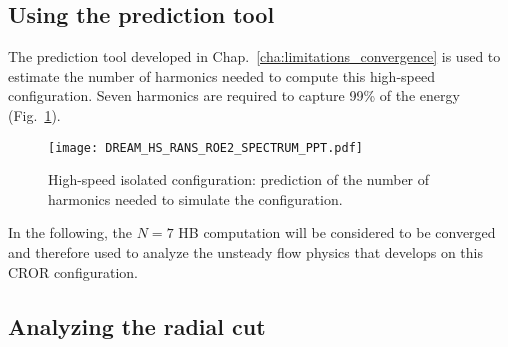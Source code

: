 
\subsection{Using the prediction tool}
\label{sub:dream_hs_conv_hb_prediction_tool}

The prediction tool developed in Chap.~\ref{cha:limitations_convergence}
is used to estimate the number of harmonics needed to compute
this high-speed configuration.
Seven harmonics are required to capture 99\% of the energy
(Fig.~\ref{fig:DREAM_HS_RANS_ROE2_SPECTRUM_PPT}).
\begin{figure}[htp]
  \centering
  \texttt{[image: DREAM\_HS\_RANS\_ROE2\_SPECTRUM\_PPT.pdf]}
  \caption{High-speed isolated configuration: prediction of the number
  of harmonics needed to simulate the configuration.}
  \label{fig:DREAM_HS_RANS_ROE2_SPECTRUM_PPT}
\end{figure}

In the following, the $N=7$ HB computation will be
considered to be converged and therefore used to 
analyze the unsteady flow physics that develops on 
this CROR configuration.

\subsection{Analyzing the radial cut}
\label{sub:dream_hs_conv_hb_slice_r}


